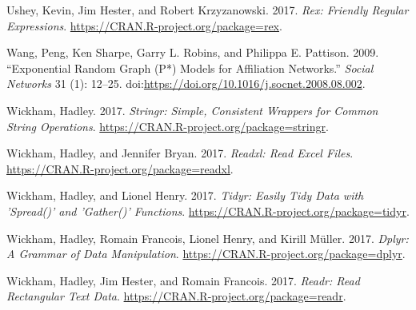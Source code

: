 \documentclass[]{book}
\theoremstyle{definition}
\theoremstyle{definition}
\theoremstyle{definition}
\theoremstyle{remark}
\begin{document}
\hypertarget{ref-R-rex}{}
Ushey, Kevin, Jim Hester, and Robert Krzyzanowski. 2017. \emph{Rex:
Friendly Regular Expressions}.
\url{https://CRAN.R-project.org/package=rex}.

\hypertarget{ref-Wang2009}{}
Wang, Peng, Ken Sharpe, Garry L. Robins, and Philippa E. Pattison. 2009.
``Exponential Random Graph (P*) Models for Affiliation Networks.''
\emph{Social Networks} 31 (1): 12--25.
doi:\href{https://doi.org/https://doi.org/10.1016/j.socnet.2008.08.002}{https://doi.org/10.1016/j.socnet.2008.08.002}.

\hypertarget{ref-R-stringr}{}
Wickham, Hadley. 2017. \emph{Stringr: Simple, Consistent Wrappers for
Common String Operations}.
\url{https://CRAN.R-project.org/package=stringr}.

\hypertarget{ref-R-readxl}{}
Wickham, Hadley, and Jennifer Bryan. 2017. \emph{Readxl: Read Excel
Files}. \url{https://CRAN.R-project.org/package=readxl}.

\hypertarget{ref-R-tidyr}{}
Wickham, Hadley, and Lionel Henry. 2017. \emph{Tidyr: Easily Tidy Data
with 'Spread()' and 'Gather()' Functions}.
\url{https://CRAN.R-project.org/package=tidyr}.

\hypertarget{ref-R-dplyr}{}
Wickham, Hadley, Romain Francois, Lionel Henry, and Kirill Müller. 2017.
\emph{Dplyr: A Grammar of Data Manipulation}.
\url{https://CRAN.R-project.org/package=dplyr}.

\hypertarget{ref-R-readr}{}
Wickham, Hadley, Jim Hester, and Romain Francois. 2017. \emph{Readr:
Read Rectangular Text Data}.
\url{https://CRAN.R-project.org/package=readr}.
\end{document}
